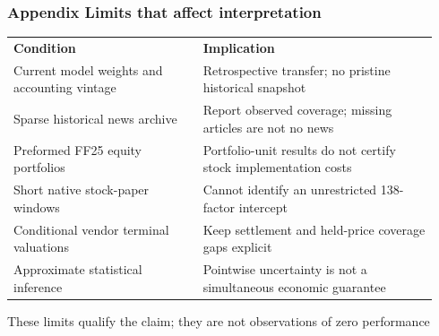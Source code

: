 \documentclass[aspectratio=169,10pt,xcolor=table]{beamer}
\begin{document}
\begin{frame}[t]
\frametitle{Appendix \textperiodcentered{} Limits that affect interpretation}
\relax
{\fontsize{8.2}{10.2}\selectfont\renewcommand{\arraystretch}{1.23}\setlength{\tabcolsep}{4pt}
\begin{tabular}{>{\raggedright\arraybackslash}p{0.42\linewidth}>{\raggedright\arraybackslash}p{0.52\linewidth}}
\rowcolor{Navy} \textcolor{Paper}{\textbf{Condition}} & \textcolor{Paper}{\textbf{Implication}}\\
\rowcolor{Paper} \textcolor{Ink}{Current model weights and accounting vintage} & \textcolor{Ink}{Retrospective transfer; no pristine historical snapshot}\\[2pt]
\rowcolor{Light} \textcolor{Ink}{Sparse historical news archive} & \textcolor{Ink}{Report observed coverage; missing articles are not no news}\\[2pt]
\rowcolor{Paper} \textcolor{Ink}{Preformed FF25 equity portfolios} & \textcolor{Ink}{Portfolio-unit results do not certify stock implementation costs}\\[2pt]
\rowcolor{Light} \textcolor{Ink}{Short native stock-paper windows} & \textcolor{Ink}{Cannot identify an unrestricted 138-factor intercept}\\[2pt]
\rowcolor{Paper} \textcolor{Ink}{Conditional vendor terminal valuations} & \textcolor{Ink}{Keep settlement and held-price coverage gaps explicit}\\[2pt]
\rowcolor{Light} \textcolor{Ink}{Approximate statistical inference} & \textcolor{Ink}{Pointwise uncertainty is not a simultaneous economic guarantee}\\[2pt]
\end{tabular}
}
\par\vspace{.3cm}
{\scriptsize\color{Muted} These limits qualify the claim; they are not observations of zero performance}\par\medskip
{}
\end{frame}
\end{document}
